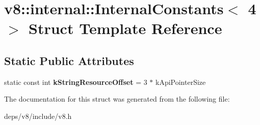 \hypertarget{structv8_1_1internal_1_1_internal_constants_3_014_01_4}{}\section{v8\+:\+:internal\+:\+:Internal\+Constants$<$ 4 $>$ Struct Template Reference}
\label{structv8_1_1internal_1_1_internal_constants_3_014_01_4}
\subsection*{Static Public Attributes}
\begin{DoxyCompactItemize}
\item 
\hypertarget{structv8_1_1internal_1_1_internal_constants_3_014_01_4_a08da692ed2a8b9ec59d9e9a07212bdd3}{}static const int {\bfseries k\+String\+Resource\+Offset} = 3 $\ast$ k\+Api\+Pointer\+Size\label{structv8_1_1internal_1_1_internal_constants_3_014_01_4_a08da692ed2a8b9ec59d9e9a07212bdd3}

\end{DoxyCompactItemize}


The documentation for this struct was generated from the following file\+:\begin{DoxyCompactItemize}
\item 
deps/v8/include/v8.\+h\end{DoxyCompactItemize}
